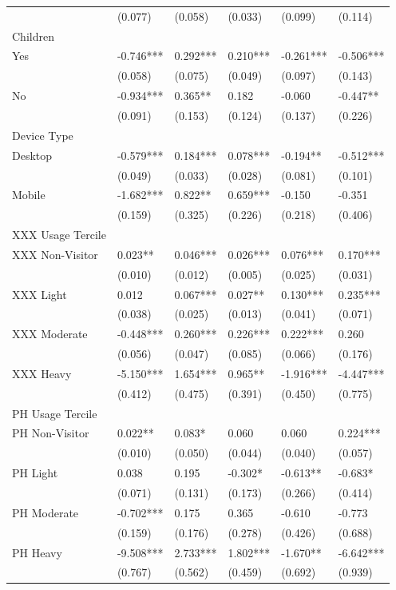 \begin{tabular}{llllll}
 & (0.077) & (0.058) & (0.033) & (0.099) & (0.114)\\
Children &  &  &  &  & \\
Yes & -0.746*** & 0.292*** & 0.210*** & -0.261*** & -0.506***\\
\addlinespace
 & (0.058) & (0.075) & (0.049) & (0.097) & (0.143)\\
No & -0.934*** & 0.365** & 0.182 & -0.060 & -0.447**\\
 & (0.091) & (0.153) & (0.124) & (0.137) & (0.226)\\
Device Type &  &  &  &  & \\
Desktop & -0.579*** & 0.184*** & 0.078*** & -0.194** & -0.512***\\
\addlinespace
 & (0.049) & (0.033) & (0.028) & (0.081) & (0.101)\\
Mobile & -1.682*** & 0.822** & 0.659*** & -0.150 & -0.351\\
 & (0.159) & (0.325) & (0.226) & (0.218) & (0.406)\\
XXX Usage Tercile &  &  &  &  & \\
XXX Non-Visitor & 0.023** & 0.046*** & 0.026*** & 0.076*** & 0.170***\\
\addlinespace
 & (0.010) & (0.012) & (0.005) & (0.025) & (0.031)\\
XXX Light & 0.012 & 0.067*** & 0.027** & 0.130*** & 0.235***\\
 & (0.038) & (0.025) & (0.013) & (0.041) & (0.071)\\
XXX Moderate & -0.448*** & 0.260*** & 0.226*** & 0.222*** & 0.260\\
 & (0.056) & (0.047) & (0.085) & (0.066) & (0.176)\\
\addlinespace
XXX Heavy & -5.150*** & 1.654*** & 0.965** & -1.916*** & -4.447***\\
 & (0.412) & (0.475) & (0.391) & (0.450) & (0.775)\\
PH Usage Tercile &  &  &  &  & \\
PH Non-Visitor & 0.022** & 0.083* & 0.060 & 0.060 & 0.224***\\
 & (0.010) & (0.050) & (0.044) & (0.040) & (0.057)\\
\addlinespace
PH Light & 0.038 & 0.195 & -0.302* & -0.613** & -0.683*\\
 & (0.071) & (0.131) & (0.173) & (0.266) & (0.414)\\
PH Moderate & -0.702*** & 0.175 & 0.365 & -0.610 & -0.773\\
 & (0.159) & (0.176) & (0.278) & (0.426) & (0.688)\\
PH Heavy & -9.508*** & 2.733*** & 1.802*** & -1.670** & -6.642***\\
\addlinespace
 & (0.767) & (0.562) & (0.459) & (0.692) & (0.939)\\
\bottomrule
\end{tabular}
